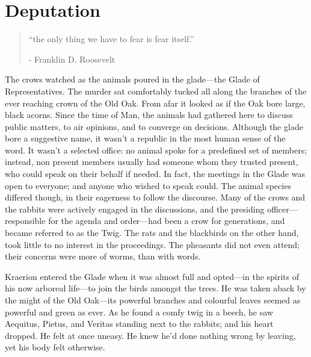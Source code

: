 \chapter{Deputation}

\vspace{-1.3cm}
\begin{localsize}{10}
	\begin{quote}
		“the only thing we have to fear is fear itself.”
		\begin{flushright}- Franklin D. Roosevelt \end{flushright}
	\end{quote} 
\end{localsize}
\vspace{1cm}

The crows watched as the animals poured in the glade---the Glade of Representatives. The murder sat comfortably tucked all along the branches of the ever reaching crown of the Old Oak. From afar it looked as if the Oak bore large, black acorns. Since the time of Man, the animals had gathered here to discuss public matters, to air opinions, and to converge on decisions. Although the glade bore a suggestive name, it wasn't a republic in the most human sense of the word. It wasn't a selected office: no animal spoke for a predefined set of members; instead, non present members usually had someone whom they trusted present, who could speak on their behalf if needed. In fact, the meetings in the Glade was open to everyone; and anyone who wished to speak could. The animal species differed though, in their eagerness to follow the discourse. Many of the crows and the rabbits were actively engaged in the discussions, and the presiding officer---responsible for the agenda and order---had been a crow for generations, and became referred to as the Twig. The rats and the blackbirds on the other hand, took little to no interest in the proceedings. The pheasants did not even attend; their concerns were more of worms, than with words.

Kraerion entered the Glade when it was almost full and opted---in the spirits of his now arboreal life---to join the birds amongst the trees. He was taken aback by the might of the Old Oak---its powerful branches and colourful leaves seemed as powerful and green as ever. As he found a comfy twig in a beech, he saw Aequitus, Pietus, and Veritas standing next to the rabbits; and his heart dropped. He felt at once uneasy. He knew he'd done nothing wrong by leaving, yet his body felt otherwise.

